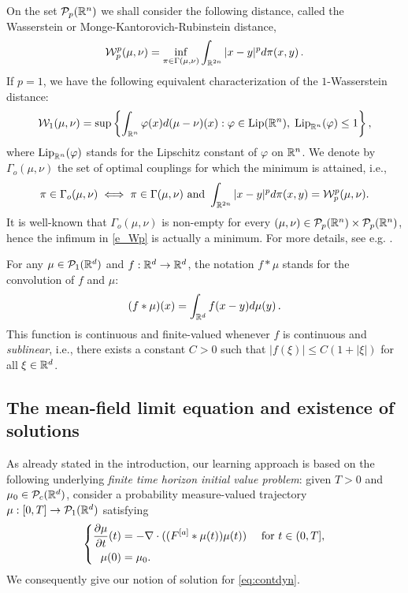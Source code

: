 On the set $\mathcal{P}_p(\mathbb{R}^n)$ we shall consider the following distance, called the Wasserstein or Monge-Kantorovich-Rubinstein distance,
\begin{align}  \label{e_Wp}
\mathcal{W}^p_p(\mu,\nu)=\inf_{\pi \in \Gamma(\mu,\nu)} \int_{\mathbb{R}^{2n}} |x-y|^p d \pi(x,y)\,.
\end{align}
If $p = 1$, we have the following equivalent characterization of the $1$-Wasserstein distance:
\begin{align}\label{dualwass}
\mathcal{W}_1(\mu,\nu)=\sup \left \{ \int_{\mathbb{R}^n} \varphi(x) d (\mu-\nu)(x)  : \varphi \in \textup{Lip}(\mathbb{R}^n), \; \textup{Lip}_{\mathbb{R}^n}(\varphi) \leq 1 \right \},
\end{align}
where $\textup{Lip}_{\mathbb{R}^n}(\varphi)$ stands for the Lipschitz constant of $\varphi$ on $\mathbb{R}^n$. We denote by $\Gamma_o(\mu,\nu)$ the set of optimal couplings for which the minimum is attained, i.e.,
\begin{align*}
\pi \in \Gamma_o(\mu, \nu) \iff \pi \in \Gamma(\mu, \nu) \text{ and } \int_{\mathbb{R}^{2n}} | x - y |^p d \pi(x,y) = \mathcal{W}^p_p(\mu,\nu).
\end{align*}
It is well-known that $\Gamma_o(\mu, \nu)$ is non-empty for every $(\mu,\nu) \in \mathcal{P}_p(\mathbb{R}^n)\times\mathcal{P}_p(\mathbb{R}^n)$, hence the infimum in \eqref{e_Wp} is actually a minimum. For more details, see e.g. \cite{AGS,villani}.

For any $\mu \in \mathcal{P}_1(\mathbb{R}^d)$ and $f: \mathbb{R}^d \to \mathbb{R}^d$, the notation $f * \mu$ stands for the convolution of $f$ and $\mu$:
\begin{align*}
(f * \mu)(x) = \int_{\mathbb{R}^d} f(x-y) d\mu(y)\,.
\end{align*}
This function is continuous and finite-valued whenever $f$ is continuous and \emph{sublinear}, i.e., there exists a constant $C > 0$ such that $| f(\xi) | \leq C (1 + |\xi|)$ for all $\xi \in \mathbb{R}^d$.

\subsection{The mean-field limit equation and existence of solutions}

As already stated in the introduction, our learning approach is based on the following underlying \textit{finite time horizon initial value problem}: given $T > 0$ and $\mu_0 \in \mathcal{P}_c(\mathbb{R}^d)$, consider a probability measure-valued trajectory $\mu:[0,T]\rightarrow \mathcal{P}_1(\mathbb{R}^d)$ satisfying 
\begin{align}\label{eq:contdyn}
\left\{\begin{aligned}
\frac{\partial \mu}{\partial t}(t) &= -\nabla \cdot ((F^{[a]}*\mu(t))\mu(t)) \quad \text{ for } t \in (0,T],\\
\mu(0) &=\mu_0.
\end{aligned}\right.
\end{align}
We consequently give our notion of solution for \eqref{eq:contdyn}.

